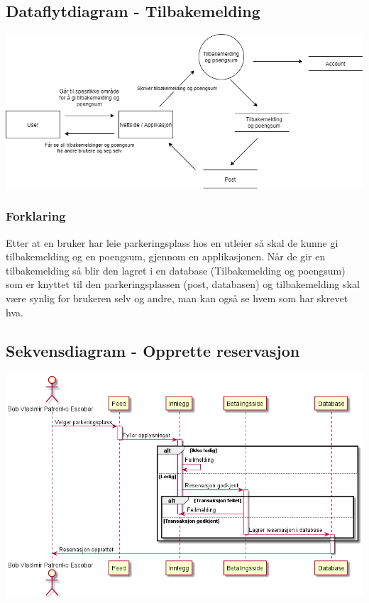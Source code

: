 \documentclass[12pt]{article}
\begin{document}
    

    \subsection{Dataflytdiagram - Tilbakemelding}
    \includegraphics[max width=\textwidth]{bilder/diagrammer/dataflyt_tilbakemelding.png}
        \subsubsection{Forklaring}
        Etter at en bruker har leie parkeringsplass hos en utleier så skal de kunne gi tilbakemelding og en poengsum, gjennom en applikasjonen. Når de gir en tilbakemelding så blir den lagret i en database (Tilbakemelding og poengsum) som er knyttet til den parkeringsplassen (post, databasen) og tilbakemelding skal være synlig for brukeren selv og andre, man kan også se hvem som har skrevet hva.

    \subsection{Sekvensdiagram - Opprette reservasjon}
    \includegraphics[max width=\textwidth]{bilder/diagrammer/sekvens_opprette reservasjon.png}
\end{document}
